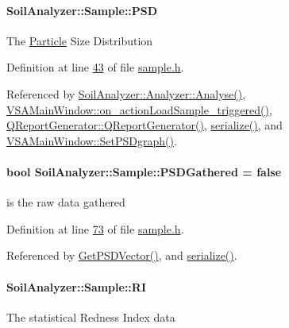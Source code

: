 \paragraph[{P\+S\+D}]{ Soil\+Analyzer\+::\+Sample\+::\+P\+S\+D}\label{class_soil_analyzer_1_1_sample_a3a2cd7007e7867a6b3fb346f51b2ba60}
The \hyperlink{class_soil_analyzer_1_1_particle}{Particle} Size Distribution 

Definition at line \hyperlink{sample_8h_source_l00043}{43} of file \hyperlink{sample_8h_source}{sample.\+h}.



Referenced by \hyperlink{analyzer_8cpp_source_l00065}{Soil\+Analyzer\+::\+Analyzer\+::\+Analyse()}, \hyperlink{vsamainwindow_8cpp_source_l00475}{V\+S\+A\+Main\+Window\+::on\+\_\+action\+Load\+Sample\+\_\+triggered()}, \hyperlink{qreportgenerator_8cpp_source_l00004}{Q\+Report\+Generator\+::\+Q\+Report\+Generator()}, \hyperlink{sample_8h_source_l00085}{serialize()}, and \hyperlink{vsamainwindow_8cpp_source_l00285}{V\+S\+A\+Main\+Window\+::\+Set\+P\+S\+Dgraph()}.

\hypertarget{class_soil_analyzer_1_1_sample_adf8e50111eab12d06ba4fc8eac00469f}{}
\paragraph[{P\+S\+D\+Gathered}]{\setlength{\rightskip}{0pt plus 5cm}bool Soil\+Analyzer\+::\+Sample\+::\+P\+S\+D\+Gathered = false\hspace{0.3cm}{\ttfamily [private]}}\label{class_soil_analyzer_1_1_sample_adf8e50111eab12d06ba4fc8eac00469f}
is the raw data gathered 

Definition at line \hyperlink{sample_8h_source_l00073}{73} of file \hyperlink{sample_8h_source}{sample.\+h}.



Referenced by \hyperlink{sample_8cpp_source_l00061}{Get\+P\+S\+D\+Vector()}, and \hyperlink{sample_8h_source_l00085}{serialize()}.

\hypertarget{class_soil_analyzer_1_1_sample_aa3530cc6d609fb9bdd4817d105f62d01}{}
\paragraph[{R\+I}]{ Soil\+Analyzer\+::\+Sample\+::\+R\+I}\label{class_soil_analyzer_1_1_sample_aa3530cc6d609fb9bdd4817d105f62d01}
The statistical Redness Index data 

